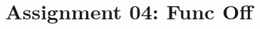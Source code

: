 \documentclass{article}
\title{Assignment 04: Func Off}
\begin{document}
\renderTitle
\end{document}
